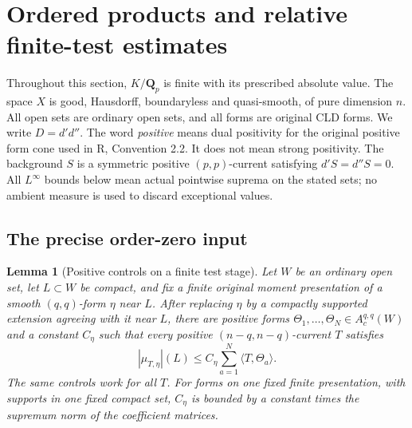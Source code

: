 \documentclass[11pt,a4paper]{article}
\numberwithin{equation}{section}
\newtheorem{lemma}[theorem]{Lemma}
\theoremstyle{definition}
\theoremstyle{remark}
\begin{document}

\section{Ordered products and relative finite-test estimates}
\label{sec:relative-cln-agent}

Throughout this section, $K/\mathbf Q_p$ is finite with its prescribed
absolute value. The space $X$ is good, Hausdorff, boundaryless and
quasi-smooth, of pure dimension $n$. All open sets are ordinary open sets,
and all forms are original CLD forms. We write $D=d'd''$.
The word \emph{positive} means dual positivity for the original positive
form cone used in R, Convention 2.2. It does not mean strong positivity.
The background $S$ is a symmetric positive $(p,p)$-current satisfying
$d'S=d''S=0$.
All $L^\infty$ bounds below mean actual pointwise suprema on the stated
sets; no ambient measure is used to discard exceptional values.

\subsection{The precise order-zero input}

\begin{lemma}[Positive controls on a finite test stage]
\label{lem:finite-positive-controls}
Let $W$ be an ordinary open set, let $L\subset W$ be compact, and fix a
finite original moment presentation of a smooth $(q,q)$-form $\eta$ near
$L$. After replacing $\eta$ by a compactly supported extension agreeing
with it near $L$, there are positive forms
$\Theta_1,\ldots,\Theta_N\in A_c^{q,q}(W)$ and a constant $C_\eta$ such that
every positive $(n-q,n-q)$-current $T$ satisfies
\begin{equation}\label{eq:finite-positive-controls}
 |\mu_{T,\eta}|(L)
 \leq C_\eta\sum_{a=1}^N\langle T,\Theta_a\rangle.
\end{equation}
The same controls work for all $T$. For forms on one fixed finite
presentation, with supports in one fixed compact set, $C_\eta$ is bounded
by a constant times the supremum norm of the coefficient matrices.
\end{lemma}
\end{document}
